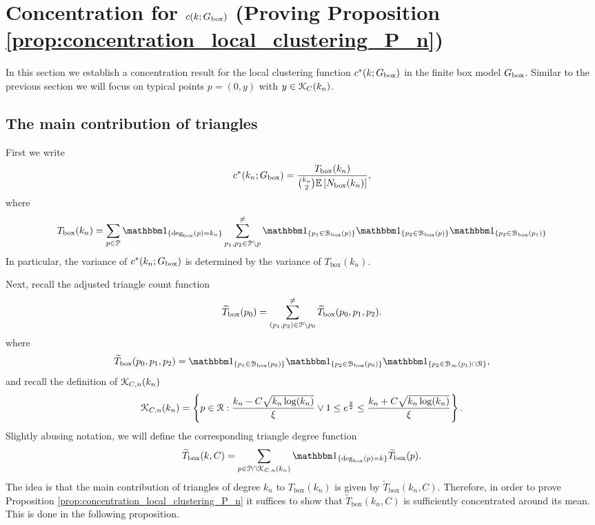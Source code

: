\section{Concentration for $c(k; G_{\text{box}})$ (Proving Proposition \ref{prop:concentration_local_clustering_P_n})}
\label{sec:concentration_c_P_n}

In this section we establish a concentration result for the local clustering function $c^\ast(k; G_{\text{box}})$ in the finite box model $G_{\text{box}}$. Similar to the previous section we will focus on typical points $p = (0,y)$ with $y \in {\mathcal K}_{C}(k_n)$.

\subsection{The main contribution of triangles}

First we write
\[
	c^\ast(k_n ; G_{\text{box}}) = \frac{T_{\text{box}}(k_n)}{\binom{k_n}{2}\mathbb{E}\left[N_{\text{box}}(k_n)\right]},
\]
where
\[
	 T_{\text{box}}(k_n) = \sum_{p \in \Pcal} \ind{\Dbox(p) = k_n} \sum_{p_1, p_2 \in \Pcal \setminus p}^{\ne} 
	 \ind{p_1 \in \BallPon{p}}\ind{p_2 \in \BallPon{p}}\ind{p_2 \in \BallPon{p_1}}
\]
In particular, the variance of $c^\ast(k_n ; G_{\text{box}})$ is determined by the variance of $T_{\text{box}}(k_n)$.

Next, recall the adjusted triangle count function
\[
	\widetilde{T}_{\text{box}}(p_0) = \sum_{(p_1, p_2) \in {\mathcal P} \setminus p_0}^{\ne} 
		\widetilde{T}_{\text{box}}(p_0,p_1,p_2).
\]
where
\[
	\widetilde{T}_{\text{box}}(p_0,p_1,p_2) = \ind{p_1 \in \BallPon{p_0}}\ind{p_2 \in \BallPon{p_0}}\ind{p_2 \in \BallPo{p_1} \cap \Rcal},
\]
and recall the definition of ${\mathcal K}_{C,n}(k_n)$
\[
	{\mathcal K}_{C,n}(k_n) = \left\{p \in {\mathcal R} : \frac{k_n - C \sqrt{k_n \log(k_n)}}{\xi} \vee 1 \le e^{\frac{y}{2}}
		\le \frac{k_n + C \sqrt{k_n \log(k_n)}}{\xi} \right\}.
\]
Slightly abusing notation, we will define the corresponding triangle degree function
\begin{equation}\label{eq:def_degree_triangle_count_in_K}
	\widetilde{T}_{\text{box}}(k, C) = \sum_{p \in \Pcal \cap \Kcal_{C,n}(k_n)} \ind{\text{deg}_{\text{box}}(p) = k} \widetilde{T}_{\text{box}}(p).
\end{equation}
The idea is that the main contribution of triangles of degree $k_n$ to $T_{\text{box}}(k_n)$ is given by $\widetilde{T}_{\text{box}}(k_n, C)$. Therefore, in order to prove Proposition \ref{prop:concentration_local_clustering_P_n} it suffices to show that $\widetilde{T}_{\text{box}}(k_n,C)$ is sufficiently concentrated around its mean. This is done in the following proposition.

